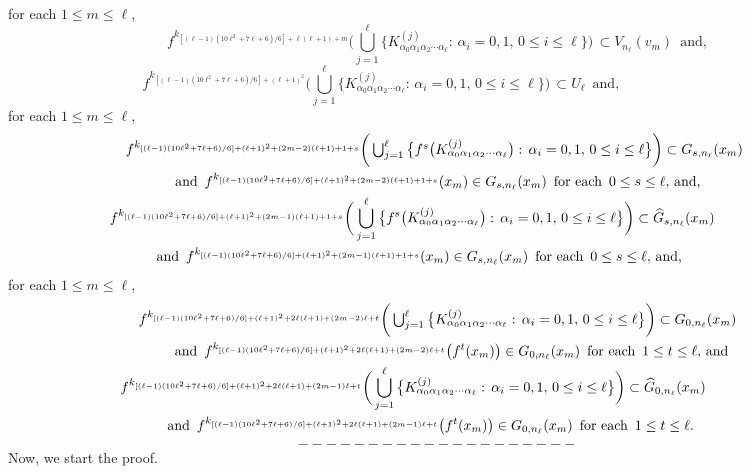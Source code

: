 \documentclass[12pt]{article}
\newcommand{\al}{\alpha}
\begin{document}
for each $1 \le m \le \ell$, 
$$
f^{k_{[(\ell-1)(10\ell^2+7\ell+6)/6]+\ell(\ell+1)+m}}\bigg(\bigcup_{j=1}^\ell \big\{ K_{\al_0\al_1\al_2\cdots\al_\ell}^{(j)}: \, \al_i = 0, 1, \, 0 \le i \le \ell \big\}\bigg) \, \subset V_{n_\ell}(v_m) \,\,\, \text{and},
$$
$$
f^{k_{[(\ell-1)(10\ell^2+7\ell+6)/6]+(\ell+1)^2}}\bigg(\bigcup_{j=1}^\ell \big\{ K_{\al_0\al_1\al_2\cdots\al_\ell}^{(j)}: \, \al_i = 0, 1, \, 0 \le i \le \ell \big\}\bigg) \, \subset U_\ell \,\,\, \text{and}, \qquad\qquad\qquad\qquad
$$
for each $1 \le m \le \ell$, 
\begin{multline*}
$$
f^{k_{[(\ell-1)(10\ell^2+7\ell+6)/6]+(\ell+1)^2+(2m-2)(\ell+1)+1+s}}\bigg(\bigcup_{j=1}^\ell \big\{ f^s\big(K_{\al_0\al_1\al_2\cdots\al_\ell}^{(j)}\big): \, \al_i = 0, 1, \, 0 \le i \le \ell \big\}\bigg) \subset G_{s,n_\ell}(x_m) \,\,\, \\ 
\text{and} \,\,\, f^{k_{[(\ell-1)(10\ell^2+7\ell+6)/6]+(\ell+1)^2+(2m-2)(\ell+1)+1+s}}(x_m) \in G_{s,n_\ell}(x_m) \,\,\, \text{for each} \,\,\, 0 \le s \le \ell, \, \text{and,} \\
\,\,\,\,\, f^{k_{[(\ell-1)(10\ell^2+7\ell+6)/6]+(\ell+1)^2+(2m-1)(\ell+1)+1+s}}\bigg(\bigcup_{j=1}^\ell \big\{ f^s\big(K_{\al_0\al_1\al_2\cdots\al_\ell}^{(j)}\big): \, \al_i = 0, 1, \, 0 \le i \le \ell \big\}\bigg) \subset \widehat G_{s,n_\ell}(x_m) \,\,\, \qquad\quad\quad \\ 
\text{and} \,\,\, f^{k_{[(\ell-1)(10\ell^2+7\ell+6)/6]+(\ell+1)^2+(2m-1)(\ell+1)+1+s}}(x_m) \in G_{s,n_\ell}(x_m) \,\,\, \text{for each} \,\,\, 0 \le s \le \ell, \, \text{and,} \quad\quad\,\,\,\,
$$
\end{multline*}
for each $1 \le m \le \ell$, 
\begin{multline*}
$$
f^{k_{[(\ell-1)(10\ell^2+7\ell+6)/6]+(\ell+1)^2+2\ell(\ell+1)+(2m-2)\ell+t}}\bigg(\bigcup_{j=1}^\ell \big\{ K_{\al_0\al_1\al_2\cdots\al_\ell}^{(j)}: \, \al_i = 0, 1, \, 0 \le i \le \ell \big\}\bigg) \subset G_{0,n_\ell}(x_m) \\ 
\qquad\, \text{and} \,\,\, f^{k_{[(\ell-1)(10\ell^2+7\ell+6)/6]+(\ell+1)^2+2\ell(\ell+1)+(2m-2)\ell+t}}\big(f^{t}(x_m)\big) \in G_{0,n_\ell}(x_m) \,\,\, \text{for each} \,\,\, 1 \le t \le \ell, \, \text{and} \, \\
\,\,\,\,\, f^{k_{[(\ell-1)(10\ell^2+7\ell+6)/6]+(\ell+1)^2+2\ell(\ell+1)+(2m-1)\ell+t}}\bigg(\bigcup_{j=1}^\ell \big\{ K_{\al_0\al_1\al_2\cdots\al_\ell}^{(j)}: \, \al_i = 0, 1, \, 0 \le i \le \ell \big\}\bigg) \subset \widehat G_{0,n_\ell}(x_m) \quad\quad\qquad\,\, \\ 
\quad\,\,\,\, \text{and} \,\,\, f^{k_{[(\ell-1)(10\ell^2+7\ell+6)/6]+(\ell+1)^2+2\ell(\ell+1)+(2m-1)\ell+t}}\big(f^{t}(x_m)\big) \in G_{0,n_\ell}(x_m) \,\,\, \text{for each} \,\,\, 1 \le t \le \ell. \quad\quad\,\,\,\,
\end{multline*}
$$--------------------$$
\indent Now, we start the proof. 
\end{document}
